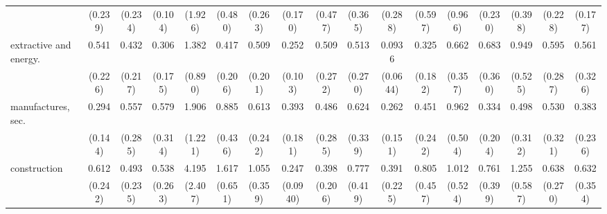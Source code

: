 {\begin{tabular}{l*{16}{c}}
                    &     (0.239)         &     (0.234)         &     (0.104)         &     (1.926)         &     (0.480)         &     (0.263)         &     (0.170)         &     (0.477)         &     (0.365)         &     (0.288)         &     (0.597)         &     (0.966)         &     (0.230)         &     (0.398)         &     (0.228)         &     (0.177)         \\
[1em]
extractive and energy.&       0.541         &       0.432         &       0.306\sym{*}  &       1.382         &       0.417         &       0.509         &       0.252\sym{***}&       0.509         &       0.513         &      0.0936\sym{***}&       0.325\sym{*}  &       0.662         &       0.683         &       0.949         &       0.595         &       0.561         \\
                    &     (0.226)         &     (0.217)         &     (0.175)         &     (0.890)         &     (0.206)         &     (0.201)         &     (0.103)         &     (0.272)         &     (0.270)         &    (0.0644)         &     (0.182)         &     (0.357)         &     (0.360)         &     (0.525)         &     (0.287)         &     (0.326)         \\
[1em]
manufactures, sec.  &       0.294\sym{*}  &       0.557         &       0.579         &       1.906         &       0.885         &       0.613         &       0.393\sym{*}  &       0.486         &       0.624         &       0.262\sym{*}  &       0.451         &       0.962         &       0.334         &       0.498         &       0.530         &       0.383         \\
                    &     (0.144)         &     (0.285)         &     (0.314)         &     (1.221)         &     (0.436)         &     (0.242)         &     (0.181)         &     (0.285)         &     (0.339)         &     (0.151)         &     (0.242)         &     (0.504)         &     (0.204)         &     (0.312)         &     (0.321)         &     (0.236)         \\
[1em]
construction        &       0.612         &       0.493         &       0.538         &       4.195\sym{*}  &       1.617         &       1.055         &       0.247\sym{***}&       0.398         &       0.777         &       0.391         &       0.805         &       1.012         &       0.761         &       1.255         &       0.638         &       0.632         \\
                    &     (0.242)         &     (0.235)         &     (0.263)         &     (2.407)         &     (0.651)         &     (0.359)         &    (0.0940)         &     (0.206)         &     (0.419)         &     (0.225)         &     (0.457)         &     (0.524)         &     (0.399)         &     (0.587)         &     (0.270)         &     (0.354)         \\

\end{tabular}}
